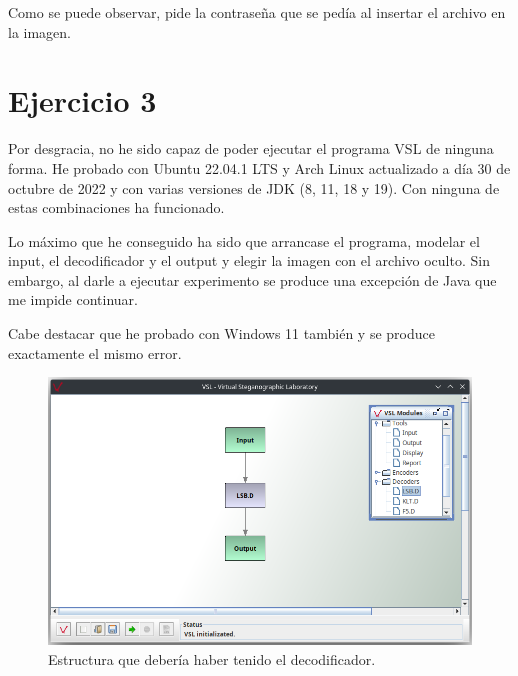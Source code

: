 \documentclass{article}
\begin{document}
\bigskip

Como se puede observar, pide la contraseña que se pedía al insertar el archivo en la imagen.


\section*{Ejercicio 3}

Por desgracia, no he sido capaz de poder ejecutar el programa VSL de ninguna forma. He probado con Ubuntu 22.04.1 LTS y Arch Linux actualizado a día 30 de octubre de 2022 y con varias versiones de JDK (8, 11, 18 y 19). Con ninguna de estas combinaciones ha funcionado. 

\bigskip

Lo máximo que he conseguido ha sido que arrancase el programa, modelar el input, el decodificador y el output y elegir la imagen con el archivo oculto. Sin embargo, al darle a ejecutar experimento se produce una excepción de Java que me impide continuar.

\bigskip

Cabe destacar que he probado con Windows 11 también y se produce exactamente el mismo error.

\begin{figure}[H]
    \includegraphics[width=\textwidth]{imagenes/Screenshot_20221030_152701.png}
    \caption{Estructura que debería haber tenido el decodificador.}
\end{figure}
\end{document}
